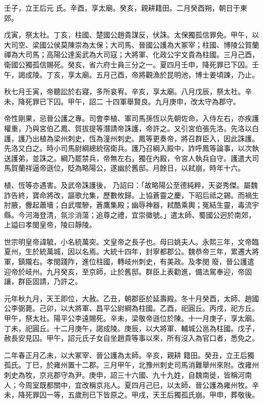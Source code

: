\begin{pinyinscope}
 壬子，立王后元
 氏。辛酉，享太廟。癸亥，親耕籍田。二月癸酉朔，朝日于東郊。



 戊寅，祭太社。丁亥，柱國、楚國公趙貴謀反，伏誅。太保獨孤信罪免。甲午，以大司空、梁國公侯莫陳崇為太保；大司馬、晉國公護為大冢宰；柱國、博陵公賀蘭禪為大司馬；高陽公達奚武為大司寇；大將軍、化政公宇文貴為柱國。三月己酉，衛國公獨孤信賜死。癸亥，省六府士員三分之一。夏四月壬申，降死罪已下囚。壬午，謁成陵。丁亥，享太廟。五月己酉，帝將觀漁於昆明池，博士姜頃諫，乃止。



 秋七月壬寅，帝聽訟於右寢，多所哀宥。辛亥，享太廟。八月戊辰，祭太社。辛未，降死罪已下囚。甲午，詔二
 十四軍舉賢良。九月庚申，改太守為郡守。



 帝性剛果，忌晉公護之專。司會李植、軍司馬孫恆以先朝佐命，入侍左右，亦疾護權重，乃與宮伯乙鳳、賀拔提等潛請帝誅護，帝許之。又引宮伯張先洛。先洛以白護，護乃出植為梁州刺史，恆為潼州刺史。鳳等更奏帝，將召群臣入，因此誅護。先洛又白之。時小司馬尉綱總統宿衛兵。護乃召綱入殿中，詐呼鳳等論事，以次執送護弟，並誅之。綱乃罷禁兵，帝無左右，獨在內殿，令宮人執兵自守。護遣大司馬賀蘭祥逼帝遜位，貶為略陽公，遂幽於舊邸。月餘日，以弒崩，時年十六。



 植、恆等亦遇害。及武帝誅護後，
 乃詔曰：「故略陽公至德純粹，天姿秀傑。屬魏詐告終，寶命將改，謳歌允集，歷數攸歸。上協蒼靈之慶，下昭后祗之錫。而禍生肘腋，釁起蕭墻；白武噬驂，蒼鷹集殿；幽辱神器，弒酷乘輿；冤結生靈，毒流宇縣。今河海登清，氛沴消蕩；追尊之禮，宜崇徽號。」遣太師、蜀國公迥於南郊，上謚曰孝閔皇帝，陵曰靜陵。



 世宗明皇帝諱毓，小名統萬突。文皇帝之長子也。母曰姚夫人。永熙三年，文帝臨夏州，生於統萬城，因以名焉。大統十四年，封寧都郡公。魏恭帝三年，累遷大將軍，鎮隴右。孝閔踐阼，進位柱國，轉岐州刺史，有美政。及孝閔
 廢，晉公護遣迎帝於岐州。九月癸亥，至京師，止於舊邸。群臣上表勸進，備法駕奉迎，帝固讓，群臣固請，乃許之。



 元年秋九月，天王即位，大赦。乙丑，朝郡臣於延壽殿。冬十月癸酉，太師、趙國公李弼薨。己卯，以大將軍、昌平公尉綱為柱國。乙酉，祀圓丘。丙戌，祀方丘。甲午，祭太社。陽平公李遠賜死。辛未，梁敬帝遜位於陳。十一月庚子，享太廟。丁未，祀圓丘。十二月庚午，謁成陵。庚辰，以大將軍、輔城公邕為柱國。戊子，赦長安見囚。甲午，詔元氏子女自坐趙貴等事以來，所有沒入為官口者，悉免之。



 二年春正月乙未，以大冢宰、晉公護為太師。辛亥，親耕
 籍田。癸丑，立王后獨孤氏。丁巳，於雍州置十二郡。三月甲午，北豫州刺史司馬消難舉州來附。改雍州刺史為牧，京兆郡守為尹。庚申，詔三十六國、九十九姓，自魏南徙，皆稱河南人；今周室既都關中，宜改稱京兆人。夏四月己巳，以太師、晉公護為雍州牧。辛未，降死罪囚一等，五歲刑已下皆原之。甲戌，天王后獨孤氏崩。甲申，葬敬後。




\end{pinyinscope}
